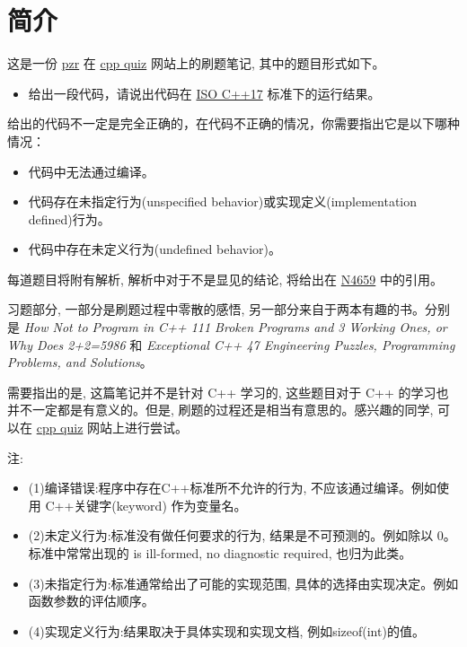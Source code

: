 \documentclass{article}
\begin{document}
	\section{简介}
	这是一份 \href{https://www.zhihu.com/people/pzr-84}{pzr} 在 \href{https://cppquiz.org}{cpp quiz} 网站上的刷题笔记, 其中的题目形式如下。
	
	\begin{itemize}
		\item 给出一段代码，请说出代码在 	\href{https://www.iso.org/standard/68564.html}{ISO C++17}
		标准下的运行结果。
	\end{itemize}
	
	给出的代码不一定是完全正确的，在代码不正确的情况，你需要指出它是以下哪种情况：
	
	\begin{itemize}
		\item 代码中无法通过编译。
		\item 代码存在未指定行为(unspecified behavior)或实现定义(implementation defined)行为。
		\item 代码中存在未定义行为(undefined behavior)。
	\end{itemize}
	
	每道题目将附有解析, 解析中对于不是显见的结论, 将给出在 \href{https://github.com/cplusplus/draft/blob/main/papers/n4659.pdf}{N4659} 中的引用。
	
	习题部分, 一部分是刷题过程中零散的感悟, 另一部分来自于两本有趣的书。分别是 \textit{How Not to Program in C++ 111 Broken Programs and 3 Working Ones, or Why Does 2+2=5986} 和 \textit{Exceptional C++ 47 Engineering Puzzles, Programming Problems, and Solutions}。
	
	需要指出的是, 这篇笔记并不是针对 C++ 学习的, 这些题目对于 C++ 的学习也并不一定都是有意义的。但是, 刷题的过程还是相当有意思的。感兴趣的同学, 可以在 \href{https://cppquiz.org}{cpp quiz} 网站上进行尝试。
	
	注:
	\begin{itemize}
		\item (1)编译错误:程序中存在C++标准所不允许的行为, 不应该通过编译。例如使用 C++关键字(keyword) 作为变量名。
		\item (2)未定义行为:标准没有做任何要求的行为, 结果是不可预测的。例如除以 0。标准中常常出现的 is ill-formed, no diagnostic required, 也归为此类。
		\item (3)未指定行为:标准通常给出了可能的实现范围, 具体的选择由实现决定。例如函数参数的评估顺序。
		\item (4)实现定义行为:结果取决于具体实现和实现文档, 例如sizeof(int)的值。
	\end{itemize}
\end{document}
